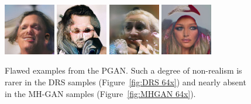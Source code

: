 \begin{figure}[htbp]
    \centering
       \includegraphics[width=0.2\textwidth]{figures/pgan/4_base_iso_base.jpg}
    \hfill
       \includegraphics[width=0.2\textwidth]{figures/pgan/5_base_iso_base.jpg}
    \hfill
       \includegraphics[width=0.2\textwidth]{figures/pgan/8_base_iso_base.jpg}
    \hfill
       \includegraphics[width=0.2\textwidth]{figures/pgan/34_base_iso_base.jpg}
    \caption{
    Flawed examples from the PGAN\@.
    Such a degree of non-realism is rarer in the DRS samples (Figure~\ref{fig:DRS 64x}) and nearly absent in the MH-GAN samples (Figure~\ref{fig:MHGAN 64x})\@.
    }
\end{figure}


